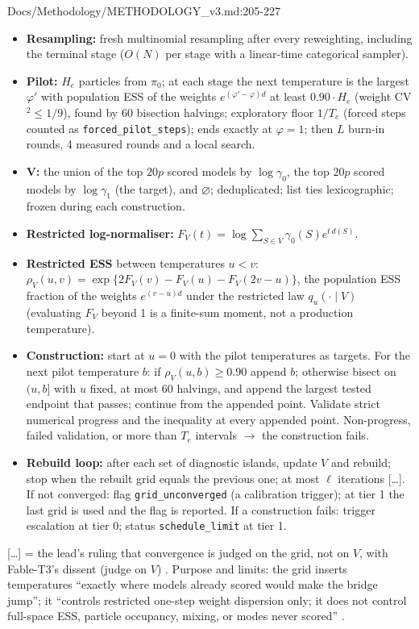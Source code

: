 \begin{stmt}{Docs/Methodology/METHODOLOGY_v3.md:205-227}
\begin{itemize}
\item \textbf{Resampling:} fresh multinomial resampling after every reweighting, including the terminal stage ($O(N)$ per stage with
  a linear-time categorical sampler).
\item \textbf{Pilot:} $H_e$ particles from $\pi_0$; at each stage the next temperature is the largest $\varphi'$ with population ESS of
  the weights $e^{(\varphi'-\varphi)d}$ at least $0.90\cdot H_e$ (weight CV$^2\le1/9$), found by 60 bisection halvings; exploratory floor
  $1/T_e$ (forced steps counted as \texttt{forced\_pilot\_steps}); ends exactly at $\varphi=1$; then $L$ burn-in rounds, 4 measured
  rounds and a local search.
\item \textbf{V:} the union of the top $20p$ scored models by $\log\gamma_0$, the top $20p$ scored models by $\log\gamma_1$ (the target),
  and $\varnothing$; deduplicated; list ties lexicographic; frozen during each construction.
\item \textbf{Restricted log-normaliser:} $F_V(t)=\log\sum_{S\in V}\gamma_0(S)e^{t\,d(S)}$.
\item \textbf{Restricted ESS} between temperatures $u<v$: $\rho_V(u,v)=\exp\{2F_V(v)-F_V(u)-F_V(2v-u)\}$, the population ESS fraction
  of the weights $e^{(v-u)d}$ under the restricted law $q_u(\cdot\mid V)$ (evaluating $F_V$ beyond 1 is a finite-sum moment, not a
  production temperature).
\item \textbf{Construction:} start at $u=0$ with the pilot temperatures as targets. For the next pilot temperature $b$: if
  $\rho_V(u,b)\ge0.90$ append $b$; otherwise bisect on $(u,b]$ with $u$ fixed, at most 60 halvings, and append the largest tested
  endpoint that passes; continue from the appended point. Validate strict numerical progress and the inequality at every
  appended point. Non-progress, failed validation, or more than $T_e$ intervals $\to$ the construction fails.
\item \textbf{Rebuild loop:} after each set of diagnostic islands, update $V$ and rebuild; stop when the rebuilt grid equals the
  previous one; at most $\ell$ iterations [\dots]. If not converged: flag \texttt{grid\_unconverged} (a calibration trigger); at
  tier 1 the last grid is used and the flag is reported. If a construction fails: trigger escalation at tier 0; status
  \texttt{schedule\_limit} at tier 1.
\end{itemize}
\end{stmt}
[\dots] = the lead's ruling that convergence is judged on the grid, not on $V$, with Fable-T3's dissent (judge on $V$)
. Purpose and limits: the grid inserts temperatures ``exactly where models
already scored would make the bridge jump''; it ``controls restricted one-step weight dispersion only; it does not control
full-space ESS, particle occupancy, mixing, or modes never scored'' .

